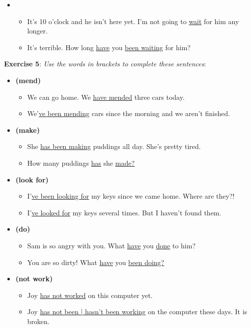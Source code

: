 \begin{itemize}
\item
\begin{itemize}
\item It's 10 o'clock and he isn't here yet. I'm not going to \underline{wait} for him any longer.
\item It's terrible. How long \underline{have} you \underline{been waiting} for him?
\end{itemize}

\end{itemize}

\textbf{Exercise 5}: \textit{Use the words in brackets to complete these sentences}:

\begin{itemize}

\item\textbf{(mend)}
\begin{itemize}
\item We can go home. We \underline{have mended} three cars today.
\item We'\underline{ve been mending} cars since the morning and we aren't finished.
\end{itemize}

\item\textbf{(make)}
\begin{itemize}
\item She \underline{has been making} puddings all day. She's pretty tired.
\item How many puddings \underline{has} she \underline{made?}
\end{itemize}

\item\textbf{(look for)}
\begin{itemize}
\item I'\underline{ve been looking for} my keys since we came home. Where are they?!
\item I'\underline{ve looked for} my keys several times. But I haven't found them.
\end{itemize}

\item\textbf{(do)}
\begin{itemize}
\item Sam is so angry with you. What \underline{have} you \underline{done} to him?
\item You are so dirty! What \underline{have} you \underline{been doing?}
\end{itemize}

\item\textbf{(not work)}
\begin{itemize}
\item Joy \underline{has not worked} on this computer yet.
\item Joy \underline{has not been | hasn't been working} on the computer these days. It is broken.
\end{itemize}


\end{itemize}
